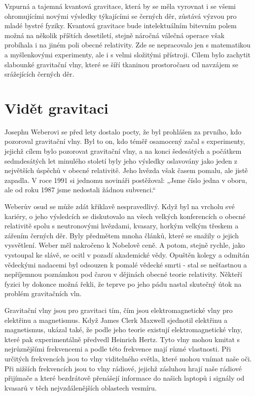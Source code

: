   Vzpurná a tajemná kvantová gravitace, která by se měla vyrovnat i se všemi ohromujícími novými
  výsledky týkajícími se černých děr, zůstává výzvou pro mladé bystré fyziky. Kvantová gravitace
  bude intelektuálním bitevním polem možná na několik příštích desetiletí, stejně náročná válečná
  operace však probíhala i na jiném poli obecné relativity. Zde se nepracovalo jen s matematikou a
  myšlenkovými experimenty, ale i s velmi složitými přístroji. Cílem bylo zachytit slabounké
  gravitační vlny, které se šíří tkaninou prostoročasu od navzájem se srážejících černých děr. 

\section{Vidět gravitaci}\label{kulIchIIIsecXI} 
  Josephu Weberovi se před lety dostalo pocty, že byl prohlášen za prvního, kdo pozoroval gravitační
  vlny. Byl to on, kdo téměř osamocený začal s experimenty, jejichž cílem bylo pozorovat gravitační
  vlny, a na konci šedesátých a počátkem sedmdesátých let minulého století byly jeho výsledky
  oslavovány jako jeden z největších úspěchů v obecné relativitě. Jeho hvězda však časem pomalu, ale
  jistě zapadla. V roce 1991 si jednomu novináři postěžoval: „Jsme číslo jedna v oboru, ale od roku
  1987 jsme nedostali žádnou subvenci.“

  Weberův osud se může zdát křiklavě nespravedlivý. Když byl na vrcholu své kariéry, o jeho
  výsledcích se diskutovalo na všech velkých konferencích o obecné relativitě spolu s neutronovými
  hvězdami, kvasary, horkým velkým třeskem a zářením černých děr. Byly předmětem mnoha článků, které
  se snažily o jejich vysvětlení. Weber měl nakročeno k Nobelově ceně. A potom, stejně rychle, jako
  vystoupal ke slávě, se ocitl v pozadí akademické vědy. Opuštěn kolegy a odmítán vědeckými nadacemi
  byl odsouzen k pomalé vědecké smrti - stal se nešťastnou a nepříjemnou poznámkou pod čarou v
  dějinách obecné teorie relativity. Někteří fyzici by dokonce možná řekli, že teprve po jeho pádu
  nastal skutečný útok na problém gravitačních vln. 

  Gravitační vlny jsou pro gravitaci tím, čím jsou elektromagnetické vlny pro elektřinu a
  magnetismus. Když James Clerk Maxwell sjednotil elektřinu a magnetismus, ukázal také, že podle
  jeho teorie existují elektromagnetické vlny, které pak experimentálně předvedl Heinrich Hertz.
  Tyto vlny mohou kmitat s nejrůznějšími frekvencemi a podle této frekvence mají různé vlastnosti.
  Při určitých frekvencích jsou to vlny viditelného světla, které mohou vnímat naše oči. Při nižších
  frekvencích jsou to vlny rádiové, jejichž zásluhou hrají naše rádiové přijímače a které bezdrátově
  přenášejí informace do našich laptopů i signály od kvasarů v těch nejvzdálenějších oblastech
  vesmíru. 

